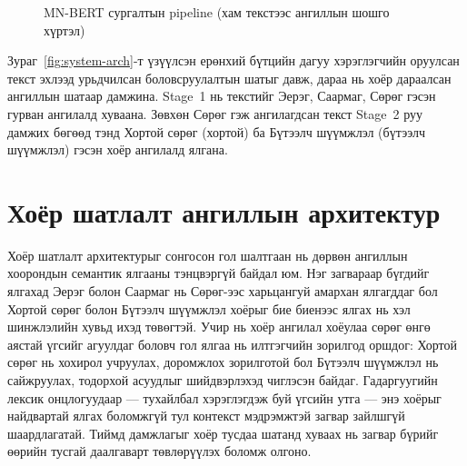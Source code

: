 \begin{figure}[H]
\centering
{}
\caption{MN-BERT сургалтын pipeline (хам текстээс ангиллын шошго хүртэл)}
\label{fig:pipeline}
\end{figure}

Зураг~\ref{fig:system-arch}-т үзүүлсэн ерөнхий бүтцийн дагуу хэрэглэгчийн
оруулсан текст эхлээд урьдчилсан боловсруулалтын шатыг давж, дараа нь хоёр
дараалсан ангиллын шатаар дамжина. Stage~1 нь текстийг Эерэг, Саармаг,
Сөрөг гэсэн гурван ангилалд хуваана. Зөвхөн Сөрөг гэж ангилагдсан
текст Stage~2 руу дамжих бөгөөд тэнд Хортой сөрөг (хортой) ба Бүтээлч шүүмжлэл
(бүтээлч шүүмжлэл) гэсэн хоёр ангилалд ялгана.

\section{Хоёр шатлалт ангиллын архитектур}

Хоёр шатлалт архитектурыг сонгосон гол шалтгаан нь дөрвөн ангиллын хоорондын
семантик ялгааны тэнцвэргүй байдал юм. Нэг загвараар бүгдийг ялгахад
Эерэг болон Саармаг нь Сөрөг-ээс харьцангуй амархан ялгагддаг бол Хортой сөрөг болон
Бүтээлч шүүмжлэл хоёрыг бие биенээс ялгах нь хэл шинжлэлийн
хувьд ихэд төвөгтэй. Учир нь хоёр ангилал хоёулаа сөрөг өнгө аястай үгсийг
агуулдаг боловч гол ялгаа нь илтгэгчийн зорилгод оршдог: Хортой сөрөг нь
хохирол учруулах, доромжлох зорилготой бол Бүтээлч шүүмжлэл нь сайжруулах,
тодорхой асуудлыг шийдвэрлэхэд чиглэсэн байдаг. Гадаргуугийн лексик
онцлогуудаар --- тухайлбал хэрэглэгдэж буй үгсийн утга --- энэ хоёрыг найдвартай
ялгах боломжгүй тул контекст мэдрэмжтэй загвар зайлшгүй шаардлагатай.
Тиймд дамжлагыг хоёр тусдаа шатанд хуваах нь загвар бүрийг өөрийн тусгай
даалгаварт төвлөрүүлэх боломж олгоно.

